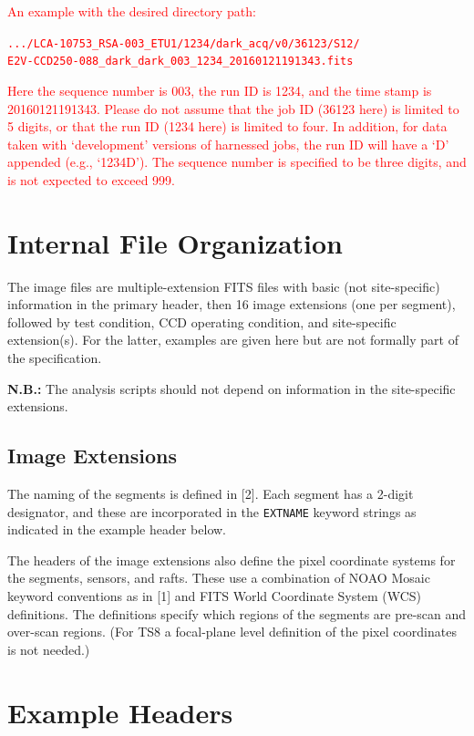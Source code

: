 \documentclass{article}[12pt]
\newcommand{\red}{\textcolor{red}}
\begin{document}
{\red{An example with the desired directory path:}

\red{{\tt .../LCA-10753\_RSA-003\_ETU1/1234/dark\_acq/v0/36123/S12/ \\ E2V-CCD250-088\_dark\_dark\_003\_1234\_20160121191343.fits}}

\red{Here the sequence number is 003, the run ID is 1234, and the time stamp is 20160121191343.  Please do not assume that the job ID (36123 here) is limited to 5 digits, or that the run ID (1234 here) is limited to four.  In addition, for data taken with `development' versions of harnessed jobs, the run ID will have a `D' appended (e.g., `1234D').  The sequence number is specified to be three digits, and is not expected to exceed 999.}

\section{Internal File Organization}

The image files are multiple-extension FITS files with basic (not site-specific) information in the primary header, then 16 image extensions (one per segment), followed by test condition, CCD operating condition, and site-specific extension(s).  For the latter, examples are given here but are not formally part of the specification.  

{\bf N.B.:} The analysis scripts should not depend on information in the site-specific extensions.

\subsection{Image Extensions}

The naming of the segments is defined in [2].  Each segment has a 2-digit designator, and these are incorporated in the {\tt EXTNAME} keyword strings as indicated in the example header below.

The headers of the image extensions also define the pixel coordinate systems for the segments, sensors, and rafts.  These use a combination of NOAO Mosaic keyword conventions as in [1] and FITS World Coordinate System (WCS) definitions.  The definitions specify which regions of the segments are pre-scan and over-scan regions.  (For TS8 a focal-plane level definition of the pixel coordinates is not needed.)

\section{Example Headers}

}
\end{document}
